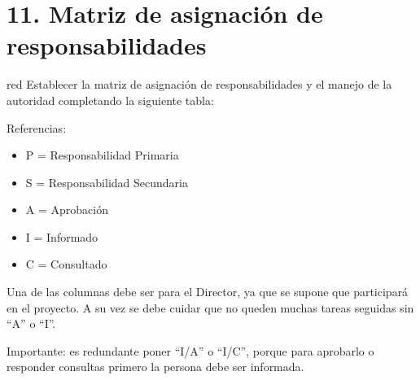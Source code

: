 \documentclass[11pt]{charter}
\begin{document}
\section{11. Matriz de asignación de responsabilidades}
\label{sec:responsabilidades}
\begin{consigna}{red}
Establecer la matriz de asignación de responsabilidades y el manejo de la autoridad completando la siguiente tabla:

\begin{table}[htpb]
\centering
{}
\end{table}

{\footnotesize
Referencias:
\begin{itemize}
	\item P = Responsabilidad Primaria
	\item S = Responsabilidad Secundaria
	\item A = Aprobación
	\item I = Informado
	\item C = Consultado
\end{itemize}
} %

Una de las columnas debe ser para el Director, ya que se supone que participará en el proyecto.
A su vez se debe cuidar que no queden muchas tareas seguidas sin ``A'' o ``I''.

Importante: es redundante poner ``I/A'' o ``I/C'', porque para aprobarlo o responder consultas primero la persona debe ser informada.

\end{consigna}
\end{document}
